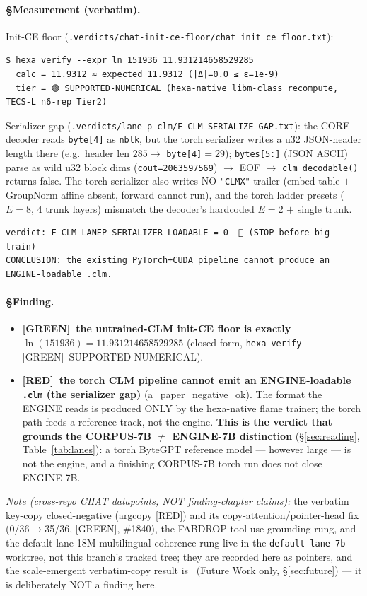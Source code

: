 \documentclass[11pt,a4paper]{article}
\providecommand{\tierGreen}{[GREEN]}
\providecommand{\tierRed}{[RED]}
\begin{document}
\paragraph{§Measurement (verbatim).}
Init-CE floor (\texttt{.verdicts/chat-init-ce-floor/chat\_init\_ce\_floor.txt}):
\begin{verbatim}
$ hexa verify --expr ln 151936 11.931214658529285
  calc = 11.9312 ≈ expected 11.9312 (|Δ|=0.0 ≤ ε=1e-9)
  tier = 🟢 SUPPORTED-NUMERICAL (hexa-native libm-class recompute, TECS-L n6-rep Tier2)
\end{verbatim}
Serializer gap (\texttt{.verdicts/lane-p-clm/F-CLM-SERIALIZE-GAP.txt}): the CORE
decoder reads \texttt{byte[4]} as \texttt{nblk}, but the torch serializer writes a
u32 JSON-header length there (e.g.\ header len $285\to$ \texttt{byte[4]}$=29$);
\texttt{bytes[5:]} (JSON ASCII) parse as wild u32 block dims (\texttt{cout=2063597569})
$\to$ EOF $\to$ \texttt{clm\_decodable()} returns false. The torch serializer also
writes NO \texttt{"CLMX"} trailer (embed table $+$ GroupNorm affine absent, forward
cannot run), and the torch ladder presets ($E{=}8$, 4 trunk layers) mismatch the
decoder's hardcoded $E{=}2$ $+$ single trunk.
\begin{verbatim}
verdict: F-CLM-LANEP-SERIALIZER-LOADABLE = 0  🔴 (STOP before big train)
CONCLUSION: the existing PyTorch+CUDA pipeline cannot produce an ENGINE-loadable .clm.
\end{verbatim}

\paragraph{§Finding.}
\begin{itemize}\itemsep0.2em
\item \textbf{\tierGreen\ the untrained-CLM init-CE floor is exactly
$\ln(151936)=11.931214658529285$} (closed-form, \texttt{hexa verify}
\tierGreen\ SUPPORTED-NUMERICAL).
\item \textbf{\tierRed\ the torch CLM pipeline cannot emit an ENGINE-loadable
\texttt{.clm} (the serializer gap)} (a\_paper\_negative\_ok). The format the ENGINE
reads is produced ONLY by the hexa-native flame trainer; the torch path feeds a
reference track, not the engine. \textbf{This is the verdict that grounds the
CORPUS-7B $\ne$ ENGINE-7B distinction} (\S\ref{sec:reading}, Table~\ref{tab:lanes}):
a torch ByteGPT reference model --- however large --- is not the engine, and a
finishing CORPUS-7B torch run does not close ENGINE-7B.
\end{itemize}
\emph{Note (cross-repo CHAT datapoints, NOT finding-chapter claims):} the verbatim
key-copy closed-negative (argcopy \tierRed) and its copy-attention/pointer-head fix
(0/36$\to$35/36, \tierGreen, \#1840), the FABDROP tool-use grounding rung, and the
default-lane 18M multilingual coherence rung live in the \texttt{default-lane-7b}
worktree, not this branch's tracked tree; they are recorded here as pointers, and
the scale-emergent verbatim-copy result is \tierOrange\ (Future Work only,
\S\ref{sec:future}) --- it is deliberately NOT a finding here.
\end{document}
